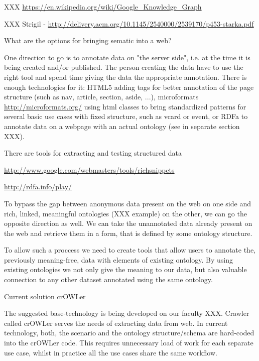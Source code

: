 XXX \url{https://en.wikipedia.org/wiki/Google_Knowledge_Graph}

XXX Strigil - \url{http://delivery.acm.org/10.1145/2540000/2539170/p453-starka.pdf}

What are the options for bringing sematic into a web? 


One direction to go is to annotate data on "the server side", i.e. at the time
it is being created and/or published. The person creating the data have to use
the right tool and spend time giving the data the appropriate annotation. There
is enough technologies for it: HTML5 adding tags for better annotation of the
page structure (such as nav, article, section, aside, ...), microformats
\url{http://microformats.org/} using html classes to bring standardized
patterns for several basic use cases with fixed structure, such as vcard or
event, or RDFa to annotate data on a webpage with an actual ontology (see in
separate section XXX).

There are tools for extracting and testing structured data 

\url{http://www.google.com/webmasters/tools/richsnippets}

\url{http://rdfa.info/play/}

To bypass the gap between anonymous data present on the web on one side and
rich, linked, meaningful ontologies (XXX example) on the other, we can go the
opposite direction as well. We can take the unannotated data already present on
the web and retrieve them in a form, that is defined by some ontology
structure. 

To allow such a proccess we need to create tools that allow users to annotate
the, previously meaning-free, data with elements of existing ontology. By using
existing ontologies we not only give the meaning to our data, but also valuable
connection to any other dataset annotated using the same ontology. 


\sec Current solution crOWLer

The suggested base-technology is being developed on our faculty XXX. Crawler
called crOWLer serves the needs of extracting data from web. In current
technology, both, the scenario and the ontology structure/schema are hard-coded
into the crOWLer code. This requires unnecessary load of work for each separate
use case, whilst in practice all the use cases share the same workflow. 

